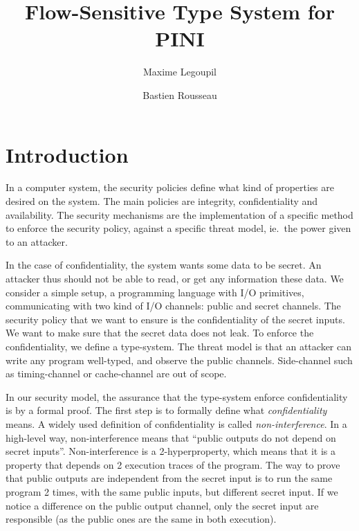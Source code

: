 \documentclass[10pt]{article}
\title{
   Flow-Sensitive Type System for PINI
}
\author{Maxime Legoupil \and Bastien Rousseau }
\begin{document}
\maketitle


\thispagestyle{empty}

\section{Introduction}
\label{sec:intro}

In a computer system, the security policies define what kind of properties are desired on the
system. The main policies are integrity, confidentiality and availability.
The security mechanisms are the implementation of a specific method to enforce the security policy,
against a specific threat model, ie.\ the power given to an attacker.

In the case of confidentiality, the system wants some data to be secret. An attacker thus should not
be able to read, or get any information these data. We consider a simple setup, a programming
language with I/O primitives, communicating with two kind of I/O channels: public and secret
channels.
The security policy that we want to ensure is the confidentiality of the secret inputs. We
want to make sure that the secret data does not leak. To enforce the confidentiality, we define a
type-system.
The threat model is that an attacker can write any program well-typed, and observe the public
channels. Side-channel such as timing-channel or cache-channel are out of scope.

In our security model, the assurance that the type-system enforce confidentiality is by a formal
proof. The first step is to formally define what \emph{confidentiality} means. A widely used
definition of confidentiality is called \emph{non-interference}. In a high-level way,
non-interference means that ``public outputs do not depend on secret inputs''.
Non-interference is a 2-hyperproperty, which means that it is a property that depends on 2
execution traces of the program. The way to prove that public outputs are independent from the
secret input is to run the same program 2 times, with the same public inputs, but different secret
input. If we notice a difference on the public output channel, only the secret input are responsible
(as the public ones are the same in both execution).
\end{document}

